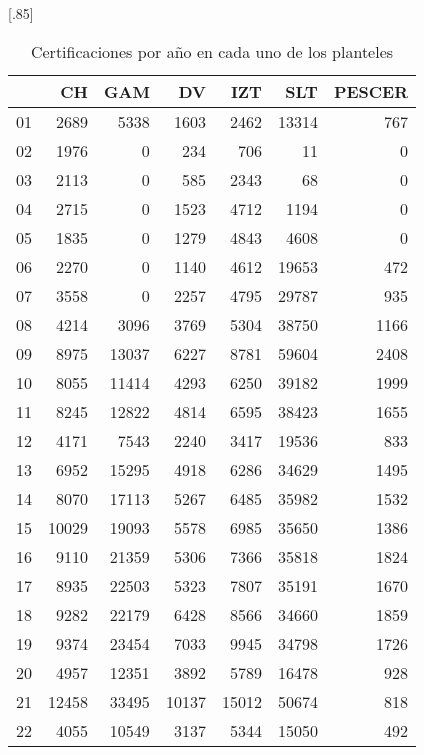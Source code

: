 \documentclass[12pt]{article}
\begin{document}
\begin{table}[ht!]
\centering
\scalebox{0.75}[.85]{
\begin{tabular}{rrrrrrr}
  \hline
 & CH & GAM & DV & IZT & SLT & PESCER \\ 
  \hline
01 & 2689 & 5338 & 1603 & 2462 & 13314 & 767 \\ 
  02 & 1976 &   0 & 234 & 706 &  11 &   0 \\ 
  03 & 2113 &   0 & 585 & 2343 &  68 &   0 \\ 
  04 & 2715 &   0 & 1523 & 4712 & 1194 &   0 \\ 
  05 & 1835 &   0 & 1279 & 4843 & 4608 &   0 \\ 
  06 & 2270 &   0 & 1140 & 4612 & 19653 & 472 \\ 
  07 & 3558 &   0 & 2257 & 4795 & 29787 & 935 \\ 
  08 & 4214 & 3096 & 3769 & 5304 & 38750 & 1166 \\ 
  09 & 8975 & 13037 & 6227 & 8781 & 59604 & 2408 \\ 
  10 & 8055 & 11414 & 4293 & 6250 & 39182 & 1999 \\ 
  11 & 8245 & 12822 & 4814 & 6595 & 38423 & 1655 \\ 
  12 & 4171 & 7543 & 2240 & 3417 & 19536 & 833 \\ 
  13 & 6952 & 15295 & 4918 & 6286 & 34629 & 1495 \\ 
  14 & 8070 & 17113 & 5267 & 6485 & 35982 & 1532 \\ 
  15 & 10029 & 19093 & 5578 & 6985 & 35650 & 1386 \\ 
  16 & 9110 & 21359 & 5306 & 7366 & 35818 & 1824 \\ 
  17 & 8935 & 22503 & 5323 & 7807 & 35191 & 1670 \\ 
  18 & 9282 & 22179 & 6428 & 8566 & 34660 & 1859 \\ 
  19 & 9374 & 23454 & 7033 & 9945 & 34798 & 1726 \\ 
  20 & 4957 & 12351 & 3892 & 5789 & 16478 & 928 \\ 
  21 & 12458 & 33495 & 10137 & 15012 & 50674 & 818 \\ 
  22 & 4055 & 10549 & 3137 & 5344 & 15050 & 492 \\ 
   \hline
\end{tabular}}
\caption{\label{Prob_Cert_Plantel_Anho}Certificaciones por a\~no en cada uno de los planteles} 
\end{table}
\end{document}
